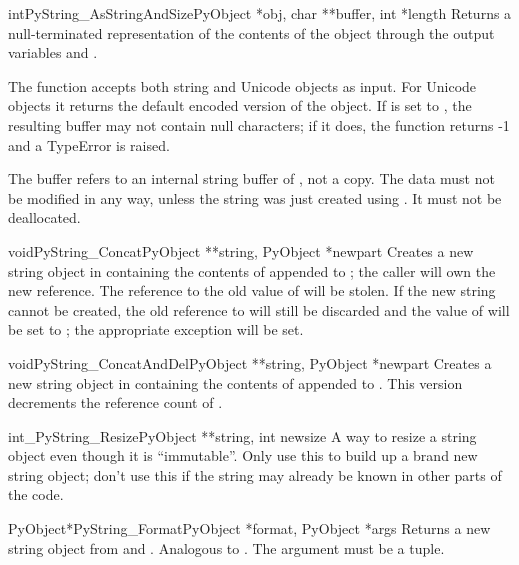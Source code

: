 \documentclass{manual}
\begin{document}
\begin{cfuncdesc}{int}{PyString_AsStringAndSize}{PyObject *obj,
                                                 char **buffer,
                                                 int *length}
Returns a null-terminated representation of the contents of the object
 through the output variables  and .

The function accepts both string and Unicode objects as input. For
Unicode objects it returns the default encoded version of the object.
If  is set to \NULL{}, the resulting buffer may not contain
null characters; if it does, the function returns -1 and a
TypeError is raised.

The buffer refers to an internal string buffer of , not a
copy. The data must not be modified in any way, unless the string was
just created using .  It must not be deallocated.
\end{cfuncdesc}

\begin{cfuncdesc}{void}{PyString_Concat}{PyObject **string,
                                         PyObject *newpart}
Creates a new string object in  containing the
contents of  appended to ; the caller will
own the new reference.  The reference to the old value of 
will be stolen.  If the new string
cannot be created, the old reference to  will still be
discarded and the value of  will be set to
\NULL{}; the appropriate exception will be set.
\end{cfuncdesc}

\begin{cfuncdesc}{void}{PyString_ConcatAndDel}{PyObject **string,
                                               PyObject *newpart}
Creates a new string object in  containing the contents
of  appended to .  This version decrements
the reference count of .
\end{cfuncdesc}

\begin{cfuncdesc}{int}{_PyString_Resize}{PyObject **string, int newsize}
A way to resize a string object even though it is ``immutable''.  
Only use this to build up a brand new string object; don't use this if
the string may already be known in other parts of the code.
\end{cfuncdesc}

\begin{cfuncdesc}{PyObject*}{PyString_Format}{PyObject *format,
                                              PyObject *args}
Returns a new string object from  and .  Analogous
to .  The  argument must be
a tuple.
\end{cfuncdesc}
\end{document}
